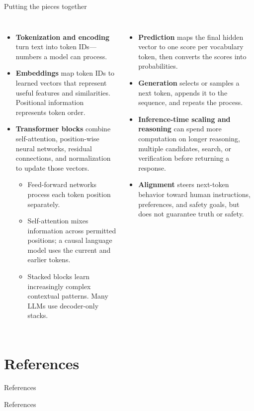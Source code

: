 \documentclass[aspectratio=169]{beamer}
\begin{document}
\begin{frame}{Putting the pieces together}
\scriptsize
\begin{columns}[T]
\begin{itemize}
  \setlength{\itemsep}{.15em}
  \item \textbf{Tokenization and encoding} turn text into token IDs---numbers a model can process.
  \item \textbf{Embeddings} map token IDs to learned vectors that represent useful features and similarities. Positional information represents token order.
  \item {\linespread{.92}\selectfont \textbf{Transformer blocks} combine self-attention, position-wise neural networks, residual connections, and normalization to update those vectors.\par}
  \begin{itemize}
    \scriptsize
    \setlength{\itemsep}{0em}
    \item Feed-forward networks process each token position separately.
    \item Self-attention mixes information across permitted positions; a causal language model uses the current and earlier tokens.
    \item Stacked blocks learn increasingly complex contextual patterns. Many LLMs use decoder-only stacks.
  \end{itemize}
\end{itemize}
\begin{itemize}
  \setlength{\itemsep}{.2em}
  \item \textbf{Prediction} maps the final hidden vector to one score per vocabulary token, then converts the scores into probabilities.
  \item \textbf{Generation} selects or samples a next token, appends it to the sequence, and repeats the process.
  \item \textbf{Inference-time scaling and reasoning} can spend more computation on longer reasoning, multiple candidates, search, or verification before returning a response.
  \item \textbf{Alignment} steers next-token behavior toward human instructions, preferences, and safety goals, but does not guarantee truth or safety.
\end{itemize}
\end{columns}
\end{frame}

\section{References}

\begin{frame}[t]{References}
\scriptsize
\printbibliography[heading=none,category=referencesone]
\end{frame}

\begin{frame}[t]{References}
\scriptsize
\printbibliography[heading=none,category=referencestwo]
\end{frame}
\end{document}
